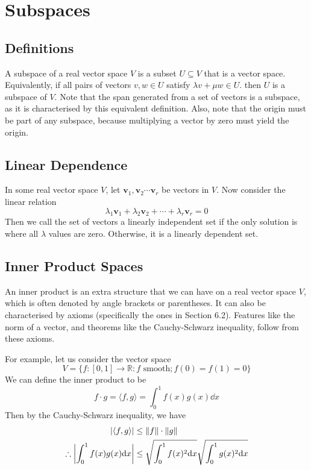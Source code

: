 \documentclass{article}
\begin{document}
	\section{Subspaces}
	\subsection{Definitions}
	A subspace of a real vector space $V$ is a subset $U \subseteq V$ that is a vector space. Equivalently, if all pairs of vectors $v, w \in U$ satisfy $\lambda v + \mu w \in U$. then $U$ is a subspace of $V$. Note that the span generated from a set of vectors is a subspace, as it is characterised by this equivalent definition. Also, note that the origin must be part of any subspace, because multiplying a vector by zero must yield the origin.
	
	\subsection{Linear Dependence}
	In some real vector space $V$, let $\bm v_1, \bm v_2 \cdots \bm v_r$ be vectors in $V$. Now consider the linear relation
	\[ \lambda_1 \bm v_1 + \lambda_2 \bm v_2 + \cdots + \lambda_r \bm v_r = 0 \]
	Then we call the set of vectors a linearly independent set if the only solution is where all $\lambda$ values are zero. Otherwise, it is a linearly dependent set.
	
	\subsection{Inner Product Spaces}
	An inner product is an extra structure that we can have on a real vector space $V$, which is often denoted by angle brackets or parentheses. It can also be characterised by axioms (specifically the ones in Section 6.2). Features like the norm of a vector, and theorems like the Cauchy-Schwarz inequality, follow from these axioms.
	
	For example, let us consider the vector space
	\[ V = \{ f: [0, 1] \to \mathbb R: f \text{ smooth}; f(0) = f(1) = 0 \} \]
	We can define the inner product to be
	\[ f \cdot g = \langle f, g \rangle = \int_0^1 f(x)g(x)\dd x \]
	Then by the Cauchy-Schwarz inequality, we have
	\begin{align*}
		\abs{\langle f, g \rangle} &\leq \norm{f} \cdot \norm{g} \\
		\therefore \abs{\int_0^1 f(x)g(x)\dd x} &\leq \sqrt{\int_0^1 f(x)^2 \dd x}\sqrt{\int_0^1 g(x)^2 \dd x}
	\end{align*}
	
\end{document}
